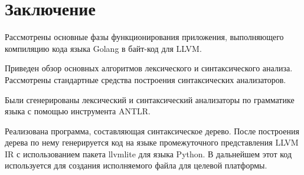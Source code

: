 \section*{Заключение}\label{sec:conclusion}

Рассмотрены основные фазы функционирования приложения, выполняющего компиляцию кода языка Golang в байт-код для LLVM.

Приведен обзор основных алгоритмов лексического и синтаксического анализа.
Рассмотрены стандартные средства построения синтаксических анализаторов.

Были сгенерированы лексический и синтаксический анализаторы по грамматике языка с помощью инструмента ANTLR.

Реализована программа, составляющая синтаксическое дерево.
После построения дерева по нему генерируется код на языке промежуточного представления LLVM IR
с использованием пакета llvmlite для языка Python.
В дальнейшем этот код используется для создания исполняемого файла для целевой платформы.

